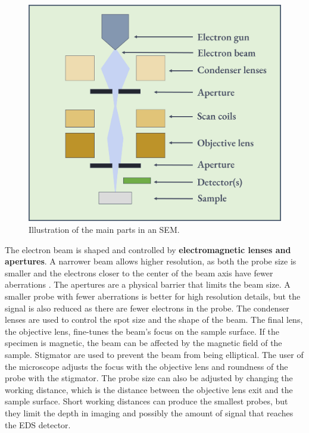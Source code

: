 \begin{figure}[ht]
    \centering
    \includegraphics[width=0.8\linewidth]{figures/SEM_setup.png}
    \caption{
        Illustration of the main parts in an SEM.
    }
    \label{fig:SEM_setup}
\end{figure}


The electron beam is shaped and controlled by \textbf{electromagnetic lenses and apertures}.
A narrower beam allows higher resolution, as both the probe size is smaller and the electrons closer to the center of the beam axis have fewer aberrations \cite{goodhew_2001}.
The apertures are a physical barrier that limits the beam size.
A smaller probe with fewer aberrations is better for high resolution details, but the signal is also reduced as there are fewer electrons in the probe.
The condenser lenses are used to control the spot size and the shape of the beam.
The final lens, the objective lens, fine-tunes the beam's focus on the sample surface.
If the specimen is magnetic, the beam can be affected by the magnetic field of the sample.
Stigmator are used to prevent the beam from being elliptical.
The user of the microscope adjusts the focus with the objective lens and roundness of the probe with the stigmator.
The probe size can also be adjusted by changing the working distance, which is the distance between the objective lens exit and the sample surface.
Short working distances can produce the smallest probes, but they limit the depth in imaging and possibly the amount of signal that reaches the EDS detector.


